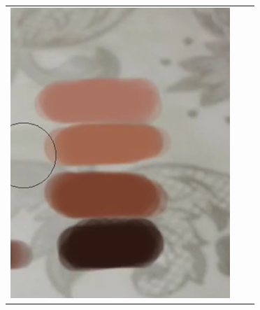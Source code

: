 \begin{longtable}{|c|c|c|}
\begin{minipage}{.29\textwidth}
    \includegraphics[width=\textwidth,height=\textheight,keepaspectratio]{images/match_body_targ}
  \end{minipage} & 
  \begin{minipage}{.29\textwidth}

\end{minipage}
\end{longtable}
